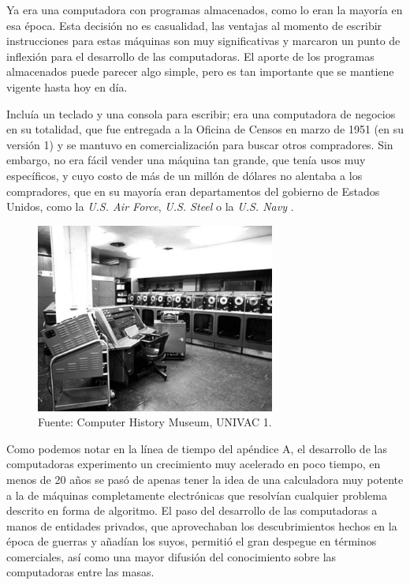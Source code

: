 \documentclass[letterpaper,12pt,oneside]{book}
\begin{document}
		Ya era una computadora con programas almacenados, como lo eran la mayoría en esa época. Esta decisión no es casualidad, las
		ventajas al momento de escribir instrucciones para estas máquinas son muy significativas y marcaron un punto de inflexión para el desarrollo de las computadoras.
		El aporte de los programas almacenados puede parecer algo simple, pero es tan importante  que se mantiene vigente hasta hoy en día.
  
        Incluía un teclado y una 
		consola para escribir; era una computadora de negocios en su totalidad, que
		fue entregada a la Oficina de Censos en marzo de 1951 (en su versión 1) y se mantuvo en comercialización para buscar otros compradores. Sin embargo, no era  fácil 
		vender una máquina
		tan grande, que tenía usos muy específicos, y cuyo costo de más de un millón de dólares no alentaba a los compradores, que en su mayoría
		eran departamentos del gobierno de Estados Unidos, como la \textit{U.S. Air Force}, \textit{U.S. Steel} o la \textit{U.S. Navy} \cite[p.43]{oregan_brief_2012}.
		
		
		\begin{figure}
		    \centering
		    \includegraphics[width=0.7\textwidth]{media/Historia/CHM_computers_1951.univacI.jpg}
		    \caption{Fuente: Computer History Museum, UNIVAC 1.}
	    	\label{fig:univac1}
		\end{figure}
		
		

		
		Como podemos notar en la línea de tiempo del apéndice A, el desarrollo de las computadoras experimento un crecimiento muy acelerado en poco tiempo, en menos de 20 años se pasó de apenas tener la idea
		de una calculadora muy potente a la de máquinas completamente electrónicas que resolvían cualquier problema
		descrito en forma de algoritmo. El paso del desarrollo de las computadoras a manos de entidades privados, que aprovechaban los
descubrimientos hechos en la época de guerras y añadían los suyos, permitió
el gran despegue en términos comerciales, así como una mayor difusión del conocimiento sobre las computadoras entre las masas.
  
\end{document}
